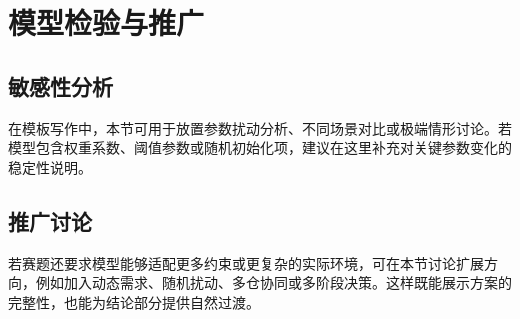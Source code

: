 \section{模型检验与推广}

\subsection{敏感性分析}

在模板写作中，本节可用于放置参数扰动分析、不同场景对比或极端情形讨论。若模型包含权重系数、阈值参数或随机初始化项，建议在这里补充对关键参数变化的稳定性说明。

\subsection{推广讨论}

若赛题还要求模型能够适配更多约束或更复杂的实际环境，可在本节讨论扩展方向，例如加入动态需求、随机扰动、多仓协同或多阶段决策。这样既能展示方案的完整性，也能为结论部分提供自然过渡。
